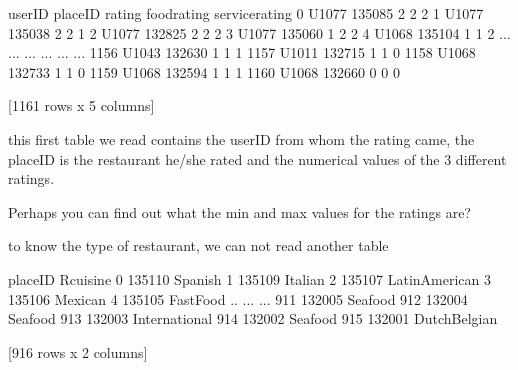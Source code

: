 \documentclass[letterpaper,10pt,english]{jupyterBook}
\begin{document}
\begin{sphinxVerbatim}[commandchars=\\\{\}]
     userID  placeID  rating  food\PYGZus{}rating  service\PYGZus{}rating
0     U1077   135085       2            2               2
1     U1077   135038       2            2               1
2     U1077   132825       2            2               2
3     U1077   135060       1            2               2
4     U1068   135104       1            1               2
...     ...      ...     ...          ...             ...
1156  U1043   132630       1            1               1
1157  U1011   132715       1            1               0
1158  U1068   132733       1            1               0
1159  U1068   132594       1            1               1
1160  U1068   132660       0            0               0

[1161 rows x 5 columns]
\end{sphinxVerbatim}

\sphinxAtStartPar
this first table we read contains the userID from whom the rating came, the placeID is the restaurant he/she rated and the numerical values of the 3 different ratings.

\sphinxAtStartPar
Perhaps you can find out what the min and max values for the ratings are?

\sphinxAtStartPar
to know the type of restaurant, we can not read another table

\begin{sphinxVerbatim}[commandchars=\\\{\}]
  
\end{sphinxVerbatim}

\begin{sphinxVerbatim}[commandchars=\\\{\}]
     placeID        Rcuisine
0     135110         Spanish
1     135109         Italian
2     135107  Latin\PYGZus{}American
3     135106         Mexican
4     135105       Fast\PYGZus{}Food
..       ...             ...
911   132005         Seafood
912   132004         Seafood
913   132003   International
914   132002         Seafood
915   132001   Dutch\PYGZhy{}Belgian

[916 rows x 2 columns]
\end{sphinxVerbatim}
\end{document}
